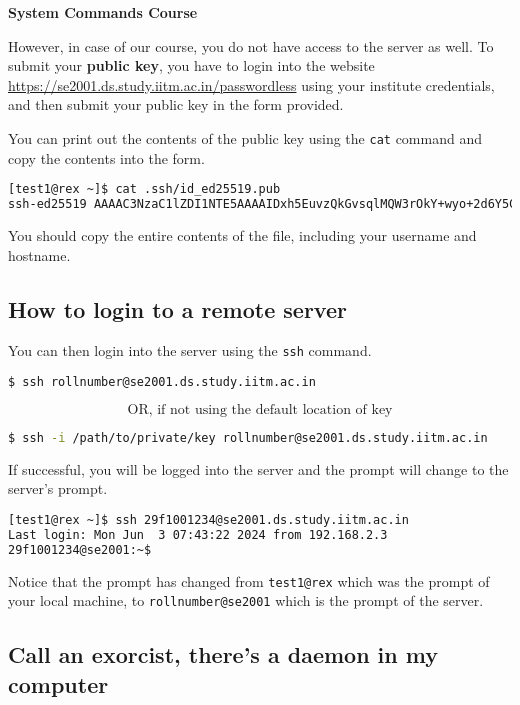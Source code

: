 \textbf{System Commands Course}

However, in case of our course, you do not have access
to the server as well. To submit your \textbf{public key},
you have to login into the website
\url{https://se2001.ds.study.iitm.ac.in/passwordless}
using your institute credentials, and then submit
your public key in the form provided.

You can print out the contents of the public key
using the \lstinline|cat| command and copy the contents
into the form.

\begin{lstlisting}[language=bash]
[test1@rex ~]$ cat .ssh/id_ed25519.pub
ssh-ed25519 AAAAC3NzaC1lZDI1NTE5AAAAIDxh5EuvzQkGvsqlMQW3rOkY+wyo+2d6Y5CSqNGlLs2a test1@rex
\end{lstlisting}

You should copy the entire contents of the file, including
your username and hostname.

\subsection{How to login to a remote server}

You can then login into the server using the \lstinline|ssh|
command.

\begin{lstlisting}[language=bash]
$ ssh rollnumber@se2001.ds.study.iitm.ac.in
\end{lstlisting}

\[
  \text{OR, if not using the default location of key}
\]

\begin{lstlisting}[language=bash]
$ ssh -i /path/to/private/key rollnumber@se2001.ds.study.iitm.ac.in
\end{lstlisting}

If successful, you will be logged into the server
and the prompt will change to the server's prompt.

\begin{lstlisting}[language=bash]
[test1@rex ~]$ ssh 29f1001234@se2001.ds.study.iitm.ac.in
Last login: Mon Jun  3 07:43:22 2024 from 192.168.2.3
29f1001234@se2001:~$
\end{lstlisting}

Notice that the prompt has changed from \lstinline|test1@rex|
which was the prompt of your local machine, to
\lstinline|rollnumber@se2001| which is the prompt of the
server.

\subsection{Call an exorcist, there's a daemon in my computer}

